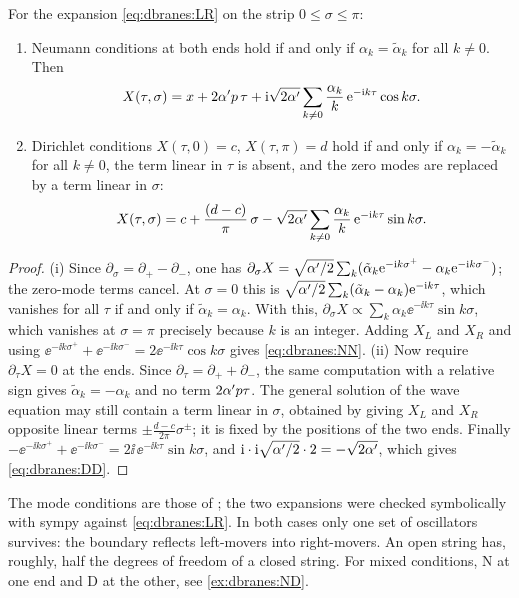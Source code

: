 \begin{proposition}\label{prop:dbranes:modes}
For the expansion \eqref{eq:dbranes:LR} on the strip $0\le\sigma\le\pi$:
\begin{enumerate}[label=(\roman*),leftmargin=*]
\item Neumann conditions at both ends hold if and only if $\alpha_k=\tilde\alpha_k$ for all
 $k\ne0$. Then
 \begin{equation}\label{eq:dbranes:NN}
  X(\tau,\sigma)=x+2\alpha' p\,\tau+\mathrm{i}\sqrt{2\alpha'}\sum_{k\ne0}\frac{\alpha_k}{k}\,
    \mathrm{e}^{-\mathrm{i} k\tau}\cos k\sigma .
 \end{equation}
\item Dirichlet conditions $X(\tau,0)=c$, $X(\tau,\pi)=d$ hold if and only if
 $\alpha_k=-\tilde\alpha_k$ for all $k\ne0$, the term linear in $\tau$ is absent, and the zero modes are
 replaced by a term linear in $\sigma$:
 \begin{equation}\label{eq:dbranes:DD}
  X(\tau,\sigma)=c+\frac{(d-c)}{\pi}\,\sigma-\sqrt{2\alpha'}\sum_{k\ne0}\frac{\alpha_k}{k}\,
    \mathrm{e}^{-\mathrm{i} k\tau}\sin k\sigma .
 \end{equation}
\end{enumerate}
\end{proposition}
\begin{proof}
(i) Since $\partial_\sigma=\partial_+-\partial_-$, one has
$\partial_\sigma X=\sqrt{\alpha'/2}\sum_k(\tilde\alpha_k\mathrm{e}^{-\mathrm{i} k\sigma^+}-\alpha_k\mathrm{e}^{-\mathrm{i} k\sigma^-})$;
the zero-mode terms cancel. At $\sigma=0$ this is
$\sqrt{\alpha'/2}\sum_k(\tilde\alpha_k-\alpha_k)\mathrm{e}^{-\mathrm{i} k\tau}$, which vanishes for all $\tau$ if and
only if $\tilde\alpha_k=\alpha_k$. With this, $\partial_\sigma X\propto\sum_k\alpha_k\ee^{-\ii k\tau}\sin k\sigma$,
which vanishes at $\sigma=\pi$ precisely because $k$ is an integer. Adding $X_L$ and $X_R$ and
using $\ee^{-\ii k\sigma^+}+\ee^{-\ii k\sigma^-}=2\ee^{-\ii k\tau}\cos k\sigma$ gives
\eqref{eq:dbranes:NN}.
(ii) Now require $\partial_\tau X=0$ at the ends. Since $\partial_\tau=\partial_++\partial_-$, the
same computation with a relative sign gives $\tilde\alpha_k=-\alpha_k$ and no term $2\alpha' p\tau$.
The general solution of the wave equation may still contain a term linear in $\sigma$, obtained
by giving $X_L$ and $X_R$ opposite linear terms $\pm\frac{d-c}{2\pi}\sigma^\pm$; it is fixed by the
positions of the two ends. Finally
$-\ee^{-\ii k\sigma^+}+\ee^{-\ii k\sigma^-}=2\ii\,\ee^{-\ii k\tau}\sin k\sigma$, and
$\mathrm{i}\cdot\mathrm{i}\sqrt{\alpha'/2}\cdot2=-\sqrt{2\alpha'}$, which gives \eqref{eq:dbranes:DD}.
\end{proof}
The mode conditions are those of ; the two
expansions were checked symbolically with sympy against \eqref{eq:dbranes:LR}. In both cases only
one set of oscillators survives: the boundary reflects left-movers into right-movers. An open
string has, roughly, half the degrees of freedom of a closed string. For mixed conditions, N at
one end and D at the other, see \cref{ex:dbranes:ND}.

